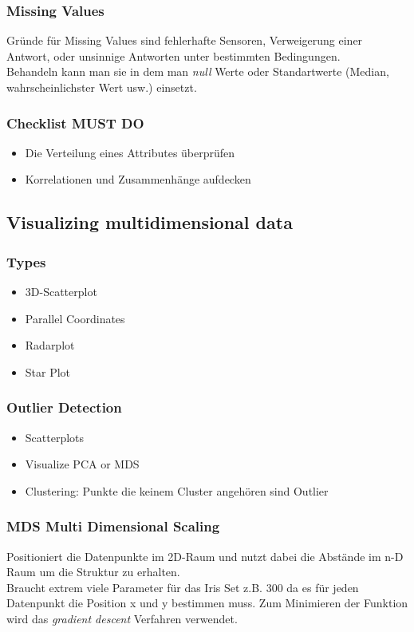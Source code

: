\documentclass[a4paper]{scrartcl}
\begin{document}
\subsubsection{Missing Values}
Gründe für Missing Values sind fehlerhafte Sensoren, Verweigerung einer Antwort, oder unsinnige Antworten unter bestimmten Bedingungen.\\
Behandeln kann man sie in dem man \textit{null} Werte oder Standartwerte (Median, wahrscheinlichster Wert usw.) einsetzt.
\subsubsection{Checklist MUST DO}
\begin{itemize}
\item Die Verteilung eines Attributes überprüfen
\item Korrelationen und Zusammenhänge aufdecken
\end{itemize}

\subsection{Visualizing multidimensional data}
\subsubsection{Types}
\begin{itemize}
\item 3D-Scatterplot
\item Parallel Coordinates
\item Radarplot
\item Star Plot 
\end{itemize}

\subsubsection{Outlier Detection}
\begin{itemize}
\item Scatterplots
\item Visualize PCA or MDS
\item Clustering: Punkte die keinem Cluster angehören sind Outlier
\end{itemize}

\subsubsection{MDS Multi Dimensional Scaling}
Positioniert die Datenpunkte im 2D-Raum und nutzt dabei die Abstände im n-D Raum um die Struktur zu erhalten.\\
Braucht extrem viele Parameter für das Iris Set z.B. 300 da es für jeden Datenpunkt die Position x und y bestimmen muss. Zum Minimieren der Funktion wird das \textit{gradient descent} Verfahren verwendet.
\end{document}
